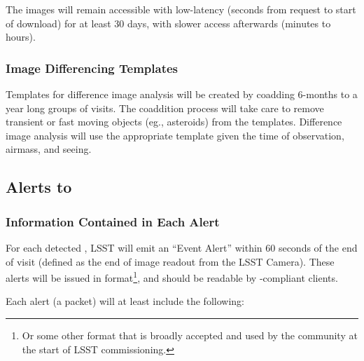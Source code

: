 \documentclass[SE,lsstdraft,toc]{lsstdoc}
\begin{document}
The images will remain accessible with low-latency (seconds from request to start of download) for at least 30 days, with slower access afterwards (minutes to hours).

\subsubsection{Image Differencing Templates}
\label{sec:templates}

Templates for difference image analysis will be created by coadding 6-months to a year long groups of visits. The coaddition process will take care to remove transient or fast moving objects (eg., asteroids) from the templates.
Difference image analysis will use the appropriate template given the time of observation, airmass, and seeing.

\subsection{Alerts to \DIASources}
\label{sec:voEventContents}

\subsubsection{Information Contained in Each Alert}

For each detected \DIASource, LSST will emit an ``Event Alert'' within 60 seconds of the end of visit (defined as the end of image readout from the LSST Camera). These alerts will be issued in \VOEvent format\footnote{Or some other format that is broadly accepted and used by the community at the start of LSST commissioning.}, and should be readable by \VOEvent-compliant clients.

Each alert (a \VOEvent packet) will at least include the following:
\end{document}
